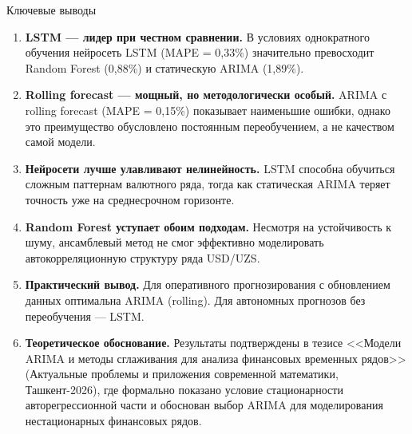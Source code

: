 \begin{frame}[shrink=15]{Ключевые выводы}

  \begin{enumerate}\small
    \setlength\itemsep{0.15cm}

    \item \textbf{LSTM --- лидер при честном сравнении.} В условиях однократного обучения нейросеть LSTM (MAPE = 0,33\%) значительно превосходит Random Forest (0,88\%) и статическую ARIMA (1,89\%).

    \item \textbf{Rolling forecast --- мощный, но методологически особый.} ARIMA с rolling forecast (MAPE = 0,15\%) показывает наименьшие ошибки, однако это преимущество обусловлено постоянным переобучением, а не качеством самой модели.

    \item \textbf{Нейросети лучше улавливают нелинейность.} LSTM способна обучиться сложным паттернам валютного ряда, тогда как статическая ARIMA теряет точность уже на среднесрочном горизонте.

    \item \textbf{Random Forest уступает обоим подходам.} Несмотря на устойчивость к шуму, ансамблевый метод не смог эффективно моделировать автокорреляционную структуру ряда USD/UZS.

    \item \textbf{Практический вывод.} Для оперативного прогнозирования с обновлением данных оптимальна ARIMA (rolling). Для автономных прогнозов без переобучения --- LSTM.
    
    \item \textbf{Теоретическое обоснование.} Результаты подтверждены в тезисе <<Модели ARIMA и методы сглаживания для анализа финансовых временных рядов>> (Актуальные проблемы и приложения современной математики, Ташкент-2026), где формально показано условие стационарности авторегрессионной части и обоснован выбор ARIMA для моделирования нестационарных финансовых рядов.
  \end{enumerate}
\end{frame}
